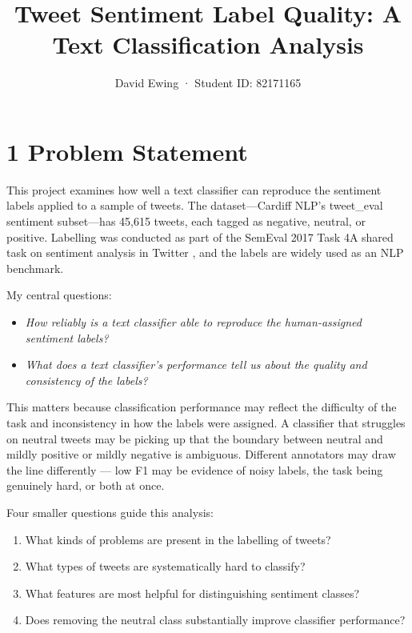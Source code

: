\documentclass[12pt]{article}
\title{Tweet Sentiment Label Quality: A Text Classification Analysis}
\author{David Ewing · Student ID: 82171165}
\date{}
\begin{document}
\maketitle

\section*{1 Problem Statement}



This project examines how well a text classifier can reproduce the sentiment labels applied to a sample of tweets. The dataset---Cardiff NLP's tweet\_eval sentiment subset---has 45,615 tweets, each tagged as negative, neutral, or positive. Labelling was conducted as part of the SemEval 2017 Task 4A shared task on sentiment analysis in Twitter \citep{rosenthal2017semeval}, and the labels are widely used as an NLP benchmark.

My central questions:

\begin{itemize}
  \item \textit{How reliably is a text classifier able to reproduce the human-assigned sentiment labels?}
  \item \textit{What does a text classifier's performance tell us about the quality and consistency of the labels?}
\end{itemize}

This matters because classification performance may reflect the difficulty of the task and inconsistency in how the labels were assigned.
A classifier that struggles on neutral tweets may be picking up that the boundary between neutral and mildly positive or mildly negative is ambiguous.
Different annotators may draw the line differently --- low F1 may be evidence of noisy labels, the task being genuinely hard, or both at once.

Four smaller questions guide this analysis:

\begin{enumerate}

  \item What kinds of problems are present in the labelling of tweets?

  \item What types of tweets are systematically hard to classify?

  \item What features are most helpful for distinguishing sentiment classes?

  \item Does removing the neutral class substantially improve classifier performance?

\end{enumerate}
\end{document}
